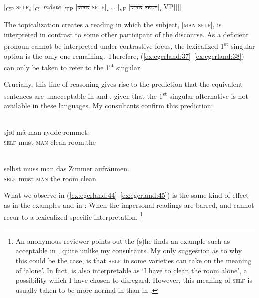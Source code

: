 \documentclass[output=paper]{LSP/langsci}
\begin{document}
\ea\label{ex:egerland:43}
[\textsubscript{CP} \textsc{self}\textit{\textsubscript{i}} [\textsubscript{C’} \textit{måste} [\textsubscript{TP} [\st{\textsc{man}} \textsc{self]}\textit{\textsubscript{i}} … [\textsubscript{vP} [\st{\textsc{man}} \st{\textsc{self}}]\textit{\textsubscript{i}} VP]]]]
\z

The topicalization creates a reading in which the subject, [\textsc{man self}], is interpreted in contrast to some other participant of the discourse. As a deficient pronoun cannot be interpreted under contrastive focus, the lexicalized 1\textsuperscript{st} singular option is the only one remaining. Therefore, (\ref{ex:egerland:37}--\ref{ex:egerland:38}) can only be taken to refer to the 1\textsuperscript{st} singular.

Crucially, this line of reasoning gives rise to the prediction that the equivalent sentences are unacceptable in  and , given that the 1\textsuperscript{st} singular alternative is not available in these languages. My consultants confirm this prediction:

\ea\label{ex:egerland:44}
\\
\gll * sjøl  må  man  rydde    rommet.\\
{} \textsc{self}  must  \textsc{man}  clean    room.the\\
\z

\ea\label{ex:egerland:45}
\\
\gll * selbst  muss  man  das  Zimmer  aufräumen.\\
{} \textsc{self}    must  \textsc{man}  the  room    clean\\
\z

What we observe in (\ref{ex:egerland:44}--\ref{ex:egerland:45}) is the same kind of effect as in the examples  and  in : When the impersonal readings are barred,  and  cannot recur to a lexicalized specific interpretation. \footnote{An anonymous reviewer points out the (s)he finds an example such as  acceptable in , quite unlike my consultants. My only suggestion as to why this could be the case, is that \textsc{self} in some  varieties can take on the meaning of ‘alone’. In fact,   is also interpretable as ‘I have to clean the room alone’, a possibility which I have chosen to disregard. However, this meaning of \textsc{self} is usually taken to be more normal in  than in .}
\end{document}
